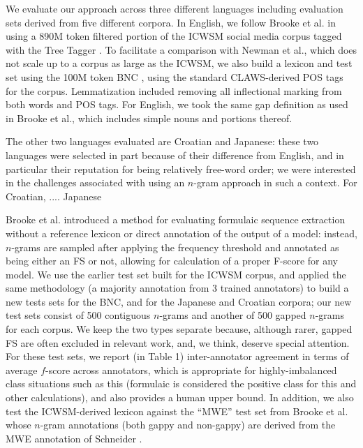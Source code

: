\documentclass[11pt]{article}
\makeatletter
\def \al {al.\@ }
\makeatother
\begin{document}
We evaluate our approach across three different languages including evaluation sets derived from five different corpora. In English, we follow Brooke et \al {} in using a 890M token filtered portion of the ICWSM social media corpus \cite{ICWSM} tagged with the Tree Tagger \cite{Schmid95}. To facilitate a comparison with Newman et \al {}, which does not scale up to a corpus as large as the ICWSM, we also build a lexicon and test set using the 100M token BNC \cite{BNC}, using the standard CLAWS-derived POS tags for the corpus. Lemmatization included removing all inflectional marking from both words and POS tags. For English, we took the same gap definition as used in Brooke et \al {}, which includes simple nouns and portions thereof.

The other two languages evaluated are Croatian and Japanese: these two languages were selected in part because of their difference from English, and in particular their reputation for being relatively free-word order; we were interested in the challenges associated with using an $n$-gram approach in such a context. For Croatian, .... Japanese

Brooke et \al {} introduced a method for evaluating formulaic sequence extraction without a reference lexicon or direct annotation of the output of a model: instead, $n$-grams are sampled after applying the frequency threshold and annotated as being either an FS or not, allowing for calculation of a proper F-score for any model. We use the earlier test set built for the ICWSM corpus, and applied the same methodology (a majority annotation from 3 trained annotators) to build a new tests sets for the BNC, and for the Japanese and Croatian corpora; our new test sets consist of 500 contiguous $n$-grams and another of 500 gapped $n$-grams for each corpus. We keep the two types separate because, although rarer, gapped FS are often excluded in relevant work, and, we think, deserve special attention.  For these test sets, we report (in Table 1) inter-annotator agreement in terms of average $f$-score across annotators, which is appropriate for highly-imbalanced class situations such as this (formulaic is considered the positive class for this and other calculations), and also provides a human upper bound. In addition, we also test the ICWSM-derived lexicon against the ``MWE'' test set from Brooke et \al {} whose $n$-gram annotations (both gappy and non-gappy) are derived from the MWE annotation of Schneider .
\end{document}

